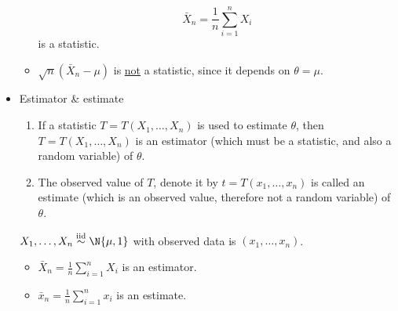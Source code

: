 \begin{itemize}
\begin{Example}{}{}
\begin{itemize}
                              \[ \bar{X}_n=\frac{1}{n} \sum_{i=1}^{n} X_i \]
                              is a statistic.
                        \item $ \sqrt{n}(\bar{X}_n-\mu) $
                              is \underline{not} a statistic, since it depends
                              on $ \theta=\mu $.
                  \end{itemize}
            \end{Example}
      \item Estimator \& estimate
            \begin{enumerate}
                  \item If a statistic $ T=T(X_1,\ldots,X_n) $
                        is used to estimate $ \theta $, then
                        $ T=T(X_1,\ldots,X_n) $ is an
                        estimator (which must be a statistic,
                        and also a random variable) of $ \theta $.
                  \item The observed value of $ T $,
                        denote it by $ t=T(x_1,\ldots,x_n) $
                        is called an estimate (which
                        is an observed value, therefore not a random variable)
                        of $ \theta $.
            \end{enumerate}
            \begin{Example}{}{}
                  $ X_1,\ldots,X_n \stackrel{\text{iid}}{\sim}\N{\mu,1} $
                  with observed data is $ (x_1,\ldots,x_n) $.
                  \begin{itemize}
                        \item $ \displaystyle \bar{X}_n=\frac{1}{n} \sum_{i=1}^{n} X_i $
                              is an estimator.
                        \item $ \displaystyle \bar{x}_n=\frac{1}{n} \sum_{i=1}^{n} x_i $
                              is an estimate.
                  \end{itemize}
            \end{Example}
\end{itemize}
